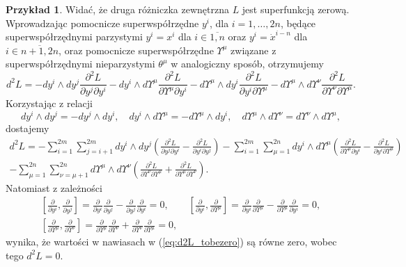 \documentclass[11pt,a4paper]{report}
\theoremstyle{definition}
\newtheorem{example}[theorem]{Przykład}
\begin{document}
\begin{example}
	Widać, że druga różniczka zewnętrzna $L$ jest superfunkcją zerową. Wprowadzając pomocnicze superwspółrzędne $y^i$, dla $i=1,\ldots,2n$, będące superwspółrzędnymi parzystymi $y^i=x^i$ dla $i \in \overline{1,n}$ oraz $y^i=\dot x^{i-n}$ dla $i \in \overline{n+1, 2n}$, oraz pomocnicze superwspółrzędne $\Upsilon^\mu$ związane z superwspółrzędnymi nieparzystymi $\theta^\mu$ w analogiczny sposób, otrzymujemy 
	\begin{equation*}
		d^2 L =-dy^i\wedge dy^j\frac{\partial^2 L}{\partial y^j \partial y^i} - dy^i\wedge d\Upsilon^\mu \frac{\partial^2 L}{\partial \Upsilon^\mu \partial y^i} - d\Upsilon^\mu \wedge dy^i\frac{\partial^2 L}{\partial y^i \partial \Upsilon^\mu} - d\Upsilon^\mu \wedge d\Upsilon^\nu \frac{\partial^2 L}{\partial \Upsilon^\nu \partial \Upsilon^\mu}.
	\end{equation*}
	Korzystając z relacji
	\begin{equation*}
		dy^i\wedge dy^j=-dy^j\wedge dy^i,\quad dy^i\wedge d\Upsilon^\mu = -d\Upsilon^\mu \wedge dy^i,\quad d\Upsilon^\mu \wedge d\Upsilon^\nu = d\Upsilon^\nu \wedge d\Upsilon^\mu,
	\end{equation*}
	dostajemy
	\begin{multline}
		\label{eq:d2L_tobezero}
		d^2 L= - \sum_{i=1}^{2m} \sum_{j=i+1}^{2m} dy^i\wedge dy^j\left(\frac{\partial^2 L}{\partial y^j\partial y^i}-\frac{\partial^2 L}{\partial y^i\partial y^j}\right)
		-\sum_{i=1}^{2m} \sum_{\mu = 1}^{2n} dy^i\wedge d\Upsilon^\mu\left( \frac{\partial^2 L}{\partial \Upsilon^\mu\partial y^i} - \frac{\partial^2 L}{\partial y^i\partial \Upsilon^\mu}\right)\\
		-\sum_{\mu=1}^{2n} \sum_{\nu=\mu+1}^{2n} d\Upsilon^\mu\wedge d\Upsilon^\nu\left(\frac{\partial^2 L}{\partial\Upsilon^\nu\partial \Upsilon^\mu}+\frac{\partial^2 L}{\partial\Upsilon^\mu\partial \Upsilon^\nu}\right).
	\end{multline}
	Natomiast z zależności
	\begin{equation*}
		\begin{gathered}
			\left[\frac{\partial }{\partial y^i},\frac{\partial }{\partial y^j}\right]=\frac{\partial }{\partial y^i}\frac{\partial }{\partial y^j}-\frac{\partial }{\partial y^j}\frac{\partial }{\partial y^i}=0,\qquad
			\left[\frac{\partial }{\partial y^i},\frac{\partial }{\partial \Upsilon^\mu}\right]=\frac{\partial }{\partial y^i}\frac{\partial }{\partial  \Upsilon^\mu}-\frac{\partial }{\partial  \Upsilon^\mu}\frac{\partial }{\partial y^i}=0, \\
			\left[\frac{\partial }{\partial \Upsilon^\mu},\frac{\partial }{\partial \Upsilon^\nu}\right]=\frac{\partial }{\partial \Upsilon^\mu}\frac{\partial }{\partial  \Upsilon^\nu}+\frac{\partial }{\partial  \Upsilon^\nu}\frac{\partial }{\partial \Upsilon^\mu}=0,
		\end{gathered}
	\end{equation*}
	wynika, że wartości w nawiasach w (\ref{eq:d2L_tobezero}) są równe zero, wobec tego $d^2L = 0.$
\end{example} 
			      				
\end{document}
